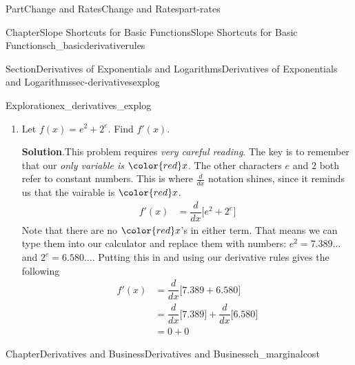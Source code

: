 \documentclass{tufte-book}
\newcommand{\blocktitlefont}{\relax}
\numberwithin{equation}{chapter}
\newcommand{\red}[1]{   {\color{red}   #1}   }
\newcommand{\blue}[1]{  {\color{blue}  #1}  }
\newcommand{\ddx}[1]{ \dfrac{d}{dx} \Big[ #1 \Big]  }
\newcommand{\amp}{&}
\begin{document}
\begin{partptx}{Part}{Change and Rates}{}{Change and Rates}{}{}{part-rates}
\begin{chapterptx}{Chapter}{Slope Shortcuts for Basic Functions}{}{Slope Shortcuts for Basic Functions}{}{}{ch_basicderivativerules}
\begin{sectionptx}{Section}{Derivatives of Exponentials and Logarithms}{}{Derivatives of Exponentials and Logarithms}{}{}{sec-derivativesexplog}
\begin{exploration}{Exploration}{}{ex_derivatives_explog}
\begin{enumerate}[font=\bfseries,label=(\alph*),ref=\alph*]
\begin{equation*}
\end{equation*}
In the second term, \(x\) is in the base, so use the power rule with \(\blue m = \blue e = \blue 2.718\dots\)%
\begin{equation*}
\ddx{{\red x}^{\blue m} = \blue m {\red x}^{\blue m - 1}}
\end{equation*}
Putting this all together  gives the following%
\begin{align*}
f'(x) \amp = \ddx{ e^{\red x} + {\red x}^e} \\
\amp = \ddx{e^{\red x}} + \ddx{{\red x}^e}  \\
\amp = e^{\red x} + {\blue e}{\red x}^{\blue e-1}  
\end{align*}
%
\item{}Let \(f(x) = e^2 + 2^e\).  Find \(f'(x)\).%
\par\smallskip%
\noindent\textbf{\blocktitlefont Solution}.\hypertarget{ex_derivatives_explog-5-2}{}\quad{}This problem requires \emph{very careful reading}. The key is to remember that our \emph{only variable is \(\red x\)}.  The other characters \(e\) and \(2\) both refer to constant numbers. This is where \(\frac{d}{dx}\) notation shines, since it reminds us that the vairable is \(\red x\).%
\begin{align*}
f'(x) \amp = \ddx{  e^2 + 2^e} 
\end{align*}
Note that there are no \(\red x\)'s in either term.  That means we can type them into our calculator and replace them with numbers: \(e^2 = 7.389\dots\) and \(2^e = 6.580\dots\).  Putting this in and using our derivative rules gives the following%
\begin{align*}
f'(x) \amp = \ddx{  7.389 + 6.580} \\
\amp = \ddx{7.389} + \ddx{6.580} \\
\amp = 0 + 0 
\end{align*}
%
\end{enumerate}%
\end{exploration}%
\end{sectionptx}
\end{chapterptx}
%
\typeout{************************************************}
\typeout{************************************************}
%
\begin{chapterptx}{Chapter}{Derivatives and Business}{}{Derivatives and Business}{}{}{ch_marginalcost}
\renewcommand*{\chaptername}{Chapter}
%
%
\typeout{************************************************}

\end{chapterptx}
\end{partptx}
\end{document}
